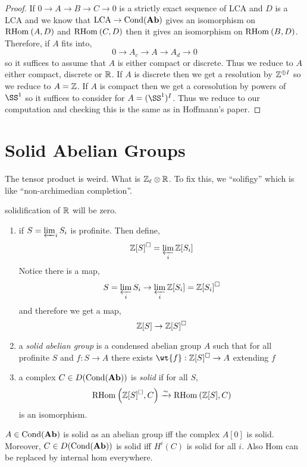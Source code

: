 \documentclass[12pt]{article}
\newcommand{\Cond}{\mathrm{Cond}}
\newcommand{\sol}{\square}
\begin{document}
\begin{proof}
If $0 \to A \to B \to C \to 0$ is a strictly exact sequence of LCA and $D$ is a LCA and we know  that $\text{LCA} \to \Cond(\Ab)$ gives an isomorphism on $\mathrm{RHom}_{} \left( A, D \right)$ and $\mathrm{RHom}_{} \left( C, D \right)$ then it gives an isomorphism on $\mathrm{RHom}_{} \left( B, D \right)$.
\bigskip\\
Therefore,  if $A$ fits into,
\[ 0 \to A_c \to A \to A_d \to 0 \]
so it suffices to assume that $A$ is either compact or discrete. Thus we reduce to $A$ either compact, discrete or $\mathbb{R}$. If $A$ is discrete then we get a resolution by $\mathbb{Z}^{\oplus I}$ so we reduce to $A = \mathbb{Z}$. If $A$ is compact then we get a coresolution by powers of $\SS^1$ so it suffices to consider for $A = (\SS^1)^I$. Thus we reduce to our computation and checking this is the same as in Hoffmann's paper. 
\end{proof}

\section{Solid Abelian Groups}

The tensor product is weird. What is $\mathbb{Z}_\ell \otimes \mathbb{R}$. To fix this, we ``solifigy'' which is like ``non-archimedian completion''. 

\begin{rmk}
solidification of $\mathbb{R}$ will be zero.
\end{rmk}

\begin{defn}
\begin{enumerate}
\item if $S = \operatorname*{\varprojlim}_i S_i$ is profinite. Then define,
\[ \mathbb{Z}[S]^{\square} = \operatorname*{\varprojlim}_i \mathbb{Z}[S_i] \]
Notice there is a map,
\[ S = \operatorname*{\varprojlim}_i S_i \to \operatorname*{\varprojlim}_i \mathbb{Z}[S_i] = \mathbb{Z}[S_i]^{\square} \]
and therefore we get a map,
\[ \mathbb{Z}[S] \to \mathbb{Z}[S]^{\square} \]

\item a \textit{solid abelian group} is a condensed abelian group $A$ such that for all profinite $S$ and $f : S \to A$ there exists $\wt{f} : \Z[S]^{\sol} \to A$ extending $f$

\item a complex $C \in D(\Cond(\Ab))$ is \textit{solid} if for all $S$, 
\[ \mathrm{RHom}_{} \left( \mathbb{Z}[S]^{\square}, C \right) \xrightarrow{\sim} \mathrm{RHom}_{} \left( \mathbb{Z}[S], C \right) \]
is an isomorphism.
\end{enumerate}
\end{defn}

\begin{prop}
$A \in \Cond(\Ab)$ is solid as an abelian group iff the complex $A[0]$ is solid. Moreover, $C \in D(\Cond(\Ab))$ is solid iff $H^i(C)$ is solid for all $i$. Also Hom can be replaced by internal hom everywhere.
\end{prop}
\end{document}
